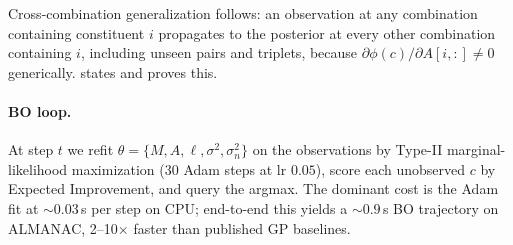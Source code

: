 \documentclass{article}
\begin{document}
Cross-combination generalization follows: an observation at any combination
containing constituent $i$ propagates to the posterior at every other
combination containing $i$, including unseen pairs and triplets, because
$\partial\phi(c)/\partial A[i,:] \ne 0$ generically.  states
and proves this.


\paragraph{BO loop.} At step $t$ we refit
$\theta = \{M, A, \ell, \sigma^2, \sigma_n^2\}$ on the observations by
Type-II marginal-likelihood maximization (30 Adam steps at lr $0.05$), score
each unobserved $c$ by Expected Improvement, and query the argmax. The
dominant cost is the Adam fit at ${\sim}0.03$\,s per step on CPU; end-to-end
this yields a ${\sim}0.9$\,s BO trajectory on ALMANAC, 2--10$\times$ faster
than published GP baselines.
\end{document}
